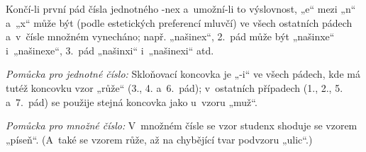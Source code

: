 Končí-li první pád čísla jednotného -nex a umožní-li to výslovnost,
„e“ mezi „n“ a „x“ může být (podle estetických preferencí mluvčí)
ve všech ostatních pádech a v čísle množném vynecháno;
např. „našinex“, 2. pád může být „našinxe“ i „našinexe“,
3. pád „našinxi“ i „našinexi“ atd.

\emph{Pomůcka pro jednotné číslo:} Skloňovací koncovka je „-i“ ve všech
pádech, kde má tutéž koncovku vzor „růže“ (3., 4. a 6. pád);
v ostatních případech (1., 2., 5. a 7. pád)
se použije stejná koncovka jako u vzoru „muž“.

\emph{Pomůcka pro množné číslo:} V množném čísle se vzor studenx
shoduje se vzorem „píseň“. (A také se vzorem růže, až na chybějící
tvar podvzoru „ulic“.)
